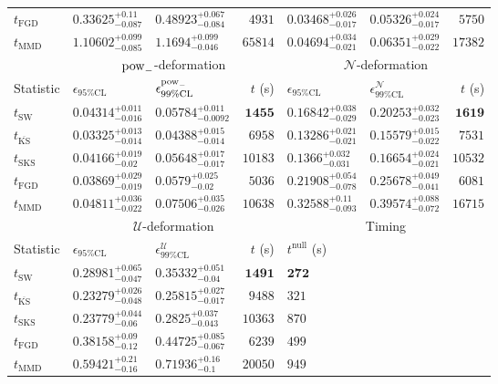 \begin{tabular}{l|llr|llr}
	$t_{\mathrm{FGD}}$ & ${\mathbf{0.33625_{-0.087}^{+0.11}}}$ & ${\mathbf{0.48923_{-0.084}^{+0.067}}}$ & $4931$ & ${\mathbf{0.03468_{-0.017}^{+0.026}}}$ & $0.05326_{-0.017}^{+0.024}$ & $5750$ \\
	$t_{\mathrm{MMD}}$ & $1.10602_{-0.085}^{+0.099}$ & $1.1694_{-0.046}^{+0.099}$ & $65814$ & $0.04694_{-0.021}^{+0.034}$ & $0.06351_{-0.022}^{+0.029}$ & $17382$ \\
	\toprule
	\multicolumn{1}{c}{} & \multicolumn{3}{c}{$\rm{pow}_{-}$-deformation} & \multicolumn{3}{c}{$\mathcal{N}$-deformation} \\
	Statistic & $\epsilon_{95\%\mathrm{CL}}$ & $\epsilon^  {\rm{pow}_{-}}_{99\%\mathrm{CL}}$ & $t$ (s) & $\epsilon_{95\%\mathrm{CL}}$ & $\epsilon^    {\mathcal{N}}_{99\%\mathrm{CL}}$ & $t$ (s) \\
	\midrule
	$t_{\mathrm{SW}}$ & $0.04314_{-0.016}^{+0.011}$ & $0.05784_{-0.0092}^{+0.011}$ & ${\mathbf{1455}}$ & $0.16842_{-0.029}^{+0.038}$ & $0.20253_{-0.023}^{+0.032}$ & ${\mathbf{1619}}$ \\
	$t_{\overline{\mathrm{KS}}}$ & ${\mathbf{0.03325_{-0.014}^{+0.013}}}$ & ${\mathbf{0.04388_{-0.014}^{+0.015}}}$ & $6958$ & ${\mathbf{0.13286_{-0.021}^{+0.021}}}$ & ${\mathbf{0.15579_{-0.022}^{+0.015}}}$ & $7531$ \\
	$t_{\mathrm{SKS}}$ & $0.04166_{-0.02}^{+0.019}$ & $0.05648_{-0.017}^{+0.017}$ & $10183$ & $0.1366_{-0.031}^{+0.032}$ & $0.16654_{-0.021}^{+0.024}$ & $10532$ \\
	$t_{\mathrm{FGD}}$ & $0.03869_{-0.019}^{+0.029}$ & $0.0579_{-0.02}^{+0.025}$ & $5036$ & $0.21908_{-0.078}^{+0.054}$ & $0.25678_{-0.041}^{+0.049}$ & $6081$ \\
	$t_{\mathrm{MMD}}$ & $0.04811_{-0.022}^{+0.036}$ & $0.07506_{-0.026}^{+0.035}$ & $10638$ & $0.32588_{-0.093}^{+0.11}$ & $0.39574_{-0.072}^{+0.088}$ & $16715$ \\
	\toprule
	\multicolumn{1}{c}{} & \multicolumn{3}{c}{$\mathcal{U}$-deformation} & \multicolumn{3}{c}{Timing} \\
	Statistic & $\epsilon_{95\%\mathrm{CL}}$ & $\epsilon^    {\mathcal{U}}_{99\%\mathrm{CL}}$ & $t$ (s) & $t^{\mathrm{null}}$ (s) \\
	\midrule
	$t_{\mathrm{SW}}$ & $0.28981_{-0.047}^{+0.065}$ & $0.35332_{-0.04}^{+0.051}$ & ${\mathbf{1491}}$ & ${\mathbf{272}}$ \\
	$t_{\overline{\mathrm{KS}}}$ & ${\mathbf{0.23279_{-0.048}^{+0.026}}}$ & ${\mathbf{0.25815_{-0.017}^{+0.027}}}$ & $9488$ & $321$ \\
	$t_{\mathrm{SKS}}$ & $0.23779_{-0.06}^{+0.044}$ & $0.2825_{-0.043}^{+0.037}$ & $10363$ & $870$ \\
	$t_{\mathrm{FGD}}$ & $0.38158_{-0.12}^{+0.09}$ & $0.44725_{-0.067}^{+0.085}$ & $6239$ & $499$ \\
	$t_{\mathrm{MMD}}$ & $0.59421_{-0.16}^{+0.21}$ & $0.71936_{-0.1}^{+0.16}$ & $20050$ & $949$ \\
	\bottomrule
\end{tabular}